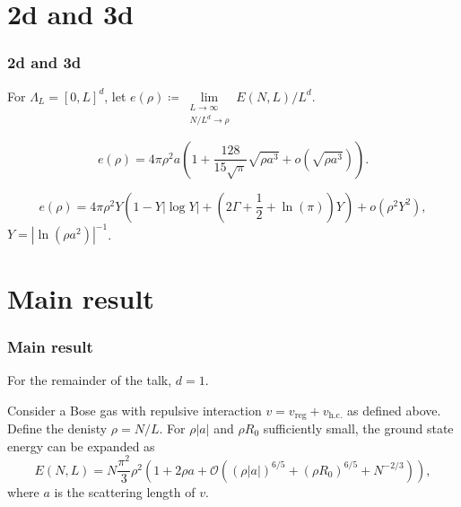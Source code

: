 \documentclass{beamer}[10]
\newcommand{\abs}[1]{\left\lvert #1 \right\rvert}
\begin{document}
\section{2d and 3d}
\begin{frame}
\frametitle{2d and 3d}
\small For $ \Lambda_L=[0,L]^d $, let $ e(\rho)\coloneqq\lim\limits_{\substack{L\to\infty\\ N/L^{d}\to\rho}}E(N,L)/L^{d} $.
\vspace*{-0.3cm}
\begin{block}{}
	\small
	\vspace*{-0.2cm}
	\begin{theorem}[\small $ d=3 $ result, Lee-Huang-Yang\footnotemark]
		\begin{equation}
		e(\rho)=4\pi\rho^2 a\left(1+\frac{128}{15\sqrt{\pi}}\sqrt{\rho a^3}+o(\sqrt{\rho a^3})\right).
		\end{equation}
	\end{theorem}
\vspace*{-0.3cm}
	\begin{theorem}[\small $ d=2 $ result\footnotemark]
		\begin{equation}
		e(\rho)=4 \pi \rho^2 Y\left(1-Y|\log Y|+\left(2 \Gamma+\frac{1}{2}+\ln (\pi)\right) Y\right)+o\left(\rho^2 Y^2\right),
		\end{equation}
		$Y=\abs{\ln(\rho a^2)}^{-1}$.
	\end{theorem}
\end{block}
\end{frame}


\section{Main result}

\begin{frame}
	\frametitle{Main result}
	For the remainder of the talk, $ d=1 $.
	\begin{block}{}
		\begin{theorem}
			\label{TheoremMain}
			Consider a Bose gas with repulsive interaction  $v=v_{\text{reg}}+v_{\text{h.c.}}$ as defined above. Define the denisty $\rho=N/L$. For $\rho|a|$ and $\rho R_0$ sufficiently small, the ground state energy can be expanded as 
			\begin{equation}
			\label{result}
			E(N,L)=N\frac{\pi^2}{3}\rho^2\left(1+2\rho a+
			\mathcal{O}
			\left((\rho|a|)^{6/5}+(\rho R_0)^{6/5}+N^{-2/3}\right)\right),
			\end{equation}
			where $a$ is the scattering length of $v$.
		\end{theorem}
	\end{block}	
\end{frame}
\end{document}

